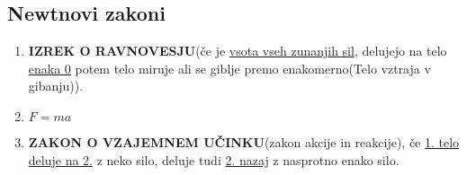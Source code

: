 {\color{indiagreen}\subsection{Newtnovi zakoni}}
\begin{enumerate}
	\item \textbf{IZREK O RAVNOVESJU}(če je \underline{vsota vseh zunanjih sil}, delujejo na telo \underline{enaka 0} potem telo miruje ali se giblje premo enakomerno(Telo vztraja v gibanju)).
	\item $F = ma$
	\item \textbf{ZAKON O VZAJEMNEM UČINKU}(zakon akcije in reakcije), če \underline{1. telo deluje na 2.} z neko silo, deluje tudi \underline{2. nazaj} z nasprotno enako silo.
\end{enumerate}
